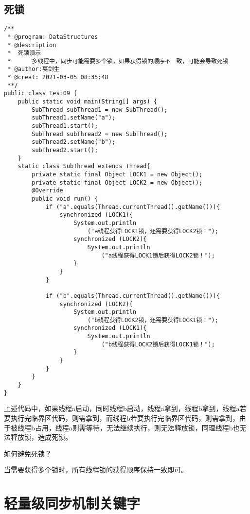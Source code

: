 \documentclass[a4paper]{report}
\begin{document}
\subsection{死锁}
\begin{Verbatim}[frame=single,numbersep=5pt,xleftmargin=1.5em,xrightmargin=1.5em]
/**
 * @program: DataStructures
 * @description
 *  死锁演示
 *      多线程中，同步可能需要多个锁，如果获得锁的顺序不一致，可能会导致死锁
 * @author:戛剑生
 * @creat: 2021-03-05 08:35:48
 **/
public class Test09 {
    public static void main(String[] args) {
        SubThread subThread1 = new SubThread();
        subThread1.setName("a");
        subThread1.start();
        SubThread subThread2 = new SubThread();
        subThread2.setName("b");
        subThread2.start();
    }
    static class SubThread extends Thread{
        private static final Object LOCK1 = new Object();
        private static final Object LOCK2 = new Object();
        @Override
        public void run() {
            if ("a".equals(Thread.currentThread().getName())){
                synchronized (LOCK1){
                    System.out.println
                        ("a线程获得LOCK1锁，还需要获得LOCK2锁！");
                    synchronized (LOCK2){
                        System.out.println
                            ("a线程获得LOCK1锁后获得LOCK2锁！");
                    }
                }
            }

            if ("b".equals(Thread.currentThread().getName())){
                synchronized (LOCK2){
                    System.out.println
                        ("b线程获得LOCK2锁，还需要获得LOCK1锁！");
                    synchronized (LOCK1){
                        System.out.println
                            ("b线程获得LOCK2锁后获得LOCK1锁！");
                    }
                }
            }
        }
    }
}
\end{Verbatim}

上述代码中，如果线程a启动，同时线程b启动，线程a拿到，线程b拿到，线程a若要执行完临界区代码，则需拿到，而线程b若要执行完临界区代码，则需拿到，由于被线程b占用，线程a则需等待，无法继续执行，则无法释放锁，同理线程b也无法释放锁，造成死锁。

如何避免死锁？

当需要获得多个锁时，所有线程锁的获得顺序保持一致即可。
\section{轻量级同步机制关键字}
\end{document}

